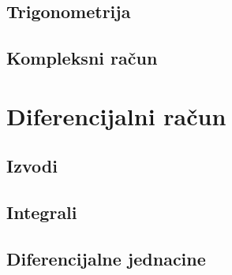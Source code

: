 \subsection{Trigonometrija}

\subsection{Kompleksni ra\v cun}

\section{Diferencijalni ra\v cun}

\subsection{Izvodi}

\subsection{Integrali}

\subsection{Diferencijalne jednacine}
